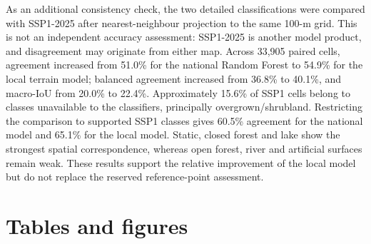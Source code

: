 As an additional consistency check, the two detailed classifications were
compared with SSP1-2025 after nearest-neighbour projection to the same 100-m
grid. This is not an independent accuracy assessment: SSP1-2025 is another
model product, and disagreement may originate from either map. Across 33,905
paired cells, agreement increased from 51.0\% for the national Random Forest to
54.9\% for the local terrain model; balanced agreement increased from 36.8\%
to 40.1\%, and macro-IoU from 20.0\% to 22.4\%. Approximately 15.6\% of SSP1
cells belong to classes unavailable to the classifiers, principally
overgrown/shrubland. Restricting the comparison to supported SSP1 classes gives
60.5\% agreement for the national model and 65.1\% for the local model. Static,
closed forest and lake show the strongest spatial correspondence, whereas
open forest, river and artificial surfaces remain weak. These results support
the relative improvement of the local model but do not replace the reserved
reference-point assessment.

\clearpage
\section*{Tables and figures}

